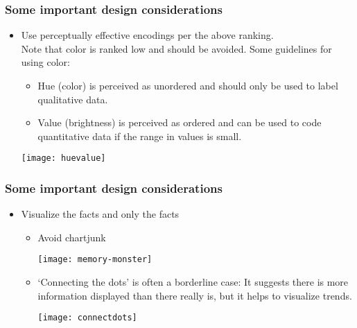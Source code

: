 \documentclass{beamer}
\begin{document}
\begin{frame}
\frametitle{Some important design considerations}
\begin{itemize}
\item Use perceptually effective encodings per the above ranking.\\
Note that color is ranked low and should be avoided. Some guidelines
for using color:\\
\begin{itemize}
\item Hue (color) is perceived as unordered and should only be used
to label qualitative data.\\
\item Value (brightness) is perceived as ordered and can be used to code
quantitative data if the range in values is small.
\end{itemize}

\begin{center}
\texttt{[image: huevalue]}
\end{center}

\end{itemize}
\end{frame}

\begin{frame}
\frametitle{Some important design considerations}
\begin{itemize}
\item Visualize the facts and only the facts\\
\begin{itemize}
\item Avoid chartjunk 

\texttt{[image: memory-monster]}

\item `Connecting the dots' is often a borderline case: It suggests
there is more information displayed than there really is, but it helps
to visualize trends.

\begin{center}
\texttt{[image: connectdots]}
\end{center}

\end{itemize}
\end{itemize}
\end{frame}
\end{document}
